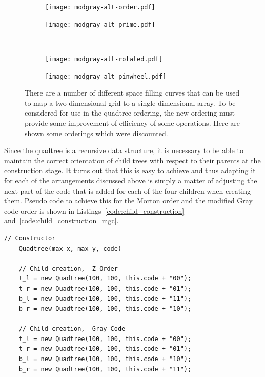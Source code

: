 \begin{figure}[tbhp]
	\centering
	\begin{subfigure}[b]{3.5cm}
		\texttt{[image: modgray-alt-order.pdf]}
		\caption{} \label{fig:modgray-alt-order.pdf}
	\end{subfigure}%
	\quad
	\begin{subfigure}[b]{3.5cm}
		\texttt{[image: modgray-alt-prime.pdf]}
		\caption{} \label{fig:modgray-alt-prime.pdf}
	\end{subfigure}
	\\[0.2cm]
	\begin{subfigure}[b]{3.5cm}
		\texttt{[image: modgray-alt-rotated.pdf]}
		\caption{} \label{fig:modgray-alt-rotated.pdf}
	\end{subfigure}%
	\quad
	\begin{subfigure}[b]{3.5cm}
		\texttt{[image: modgray-alt-pinwheel.pdf]}
		\caption{}\label{fig:modgray-alt-pinwheel.pdf}
	\end{subfigure}
	\caption{There are a number of different space filling curves that can be
	used to map a two dimensional grid to a single dimensional array. To be
	considered for use in the quadtree ordering, the new ordering must provide
	some improvement of efficiency of some operations. Here are shown some
	orderings which were discounted.}
	\label{fig:modgray-2-alternatives}
\end{figure}

Since the quadtree is a recursive data structure, it is necessary to be able to
maintain the correct orientation of child trees with respect to their parents
at the construction stage. It turns out that this is easy to achieve and thus
adapting it for each of the arrangements discussed above is simply a matter of
adjusting the next part of the code that is added for each of the four children
when creating them. Pseudo code to achieve this for the Morton order and the
modified Gray code order is shown in Listings~\ref{code:child_construction}
and~\ref{code:child_construction_mgc}.

\begin{lstlisting}[caption={Code to generate children of the current quadtree
while maintaining the correct ordering. Z- and Gray ordering.},
label=code:child_construction]
	// Constructor
	Quadtree(max_x, max_y, code)

	// Child creation,  Z-Order
	t_l = new Quadtree(100, 100, this.code + "00");
	t_r = new Quadtree(100, 100, this.code + "01");
	b_l = new Quadtree(100, 100, this.code + "11");
	b_r = new Quadtree(100, 100, this.code + "10");

	// Child creation,  Gray Code
	t_l = new Quadtree(100, 100, this.code + "00");
	t_r = new Quadtree(100, 100, this.code + "01");
	b_l = new Quadtree(100, 100, this.code + "10");
	b_r = new Quadtree(100, 100, this.code + "11");
\end{lstlisting}

